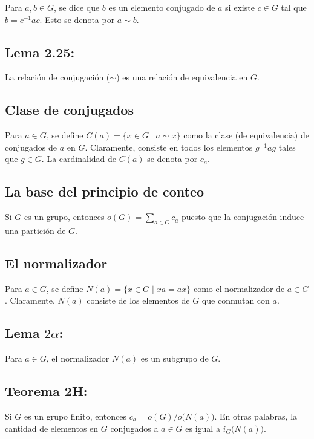 \documentclass{article}
\begin{document}
Para $a,b\in G$, se dice que $b$ es un elemento conjugado de $a$ si existe $c\in G$ tal que $b=c^{-1}ac$. Esto se denota por $a\sim b$.

\subsection*{\color{blue} Lema 2.25:}

La relación de conjugación ($\sim$) es una relación de equivalencia en $G$.

\subsection*{\color{violet} Clase de conjugados}

Para $a\in G$, se define $C(a)=\{x\in G\mid a\sim x\}$ como la clase (de equivalencia) de conjugados de $a$ en $G$. Claramente, consiste en todos los elementos $g^{-1}ag$ tales que $g\in G$. La cardinalidad de $C(a)$ se denota por $c_a$.

\subsection*{\color{purple} La base del principio de conteo}

Si $G$ es un grupo, entonces $o(G)=\displaystyle\sum_{a\in G}c_a$ puesto que la conjugación induce una partición de $G$.

\subsection*{\color{violet} El normalizador}

Para $a\in G$, se define $N(a)=\{x\in G\mid xa=ax\}$ como el normalizador de $a\in G$. Claramente, $N(a)$ consiste de los elementos de $G$ que conmutan con $a$.

\subsection*{\color{blue} Lema $2\alpha$:}

Para $a\in G$, el normalizador $N(a)$ es un subgrupo de $G$.

\subsection*{\color{red} Teorema 2H:}

Si $G$ es un grupo finito, entonces $c_a=o(G)/o\big(N(a)\big)$. En otras palabras, la cantidad de elementos en $G$ conjugados a $a\in G$ es igual a $i_{G}\big(N(a)\big)$.
\end{document}
